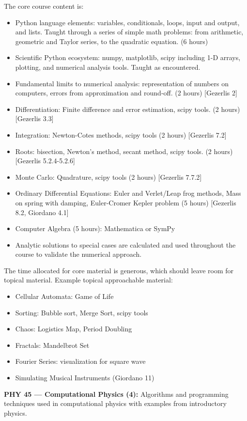\documentclass[12pt]{article}
\begin{document}
The core course content is:
\begin{itemize}
\item Python language elements:  variables, conditionals, loops, input and output, and lists. Taught through a series of simple math problems: from arithmetic, geometric and Taylor series, to the quadratic equation. (6 hours)
\item Scientific Python ecosystem:  numpy, matplotlib, scipy including 1-D arrays, plotting, and numerical analysis tools.  Taught as encountered.
\item Fundamental limits to numerical analysis:  representation of numbers on computers, errors from approximation and round-off. (2 hours) [Gezerlis 2]
\item Differentiation:  Finite difference and error estimation, scipy tools. (2 hours) [Gezerlis 3.3]
\item Integration:  Newton-Cotes methods, scipy tools (2 hours) [Gezerlis 7.2]
\item Roots: bisection, Newton's method, secant method, scipy tools. (2 hours) [Gezerlis 5.2.4-5.2.6]
\item Monte Carlo: Quadrature, scipy tools (2 hours) [Gezerlis 7.7.2]
\item Ordinary Differential Equations:  Euler and Verlet/Leap frog methods, Mass on spring with damping, Euler-Cromer Kepler problem (5 hours) [Gezerlis 8.2, Giordano 4.1]
\item Computer Algebra (5 hours):  Mathematica or SymPy
\item Analytic solutions to special cases are calculated and used throughout the
  course to validate the numerical approach.
\end{itemize}
The time allocated for core material is generous, which should leave room for topical material.  Example topical approachable material:
\begin{itemize}
\item Cellular Automata:  Game of Life
\item Sorting:  Bubble sort, Merge Sort, scipy tools
\item Chaos:  Logistics Map, Period Doubling
\item Fractals: Mandelbrot Set
\item Fourier Series:  visualization for square wave
\item Simulating Musical Instruments (Giordano 11)
\end{itemize}

\vskip 1cm
\noindent
{\bf PHY 45 --- Computational Physics (4):}
Algorithms and programming techniques used in computational physics
with examples from introductory physics.
\end{document}
